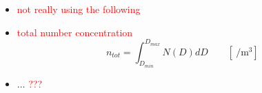 \begin{itemize}


	\item \textcolor{red}{not really using the following}
	\item \textcolor{red}{total number concentration} \\
	$$n_{tot} = \int_{D_{min}}^{D_{max}} N(D) dD \qquad [\SI{}{\per\cubic\metre}]$$ 
\item $\ldots$ \textcolor{red}{??? }

\end{itemize}


% 


% 
% 


